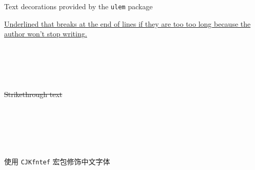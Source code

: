 \documentclass{ctexbeamer}
\begin{document}
\begin{frame}{Text decorations provided by the
\texttt{ulem} package}

\uline{Underlined that breaks at the end of lines if
they are too too long because the author won’t stop
writing.} \\~\\

 \\~\\

 \\~\\

\sout{Strikethrough text} \\~\\

 \\~\\

 \\~\\ 


\end{frame}

\begin{frame}{使用 \texttt{CJKfntef} 宏包修饰中文字体}

 \\~\\

 \\~\\

 \\~\\

 \\~\\

 \\~\\


\end{frame}
\end{document}

